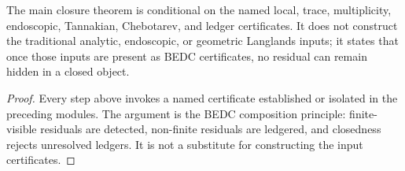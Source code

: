 \begin{theorem}
\label{thm:unified-reality-main-closure-boundary}
The main closure theorem is conditional on the named local, trace,
multiplicity, endoscopic, Tannakian, Chebotarev, and ledger
certificates. It does not construct the traditional analytic,
endoscopic, or geometric Langlands inputs; it states that once those
inputs are present as BEDC certificates, no residual can remain hidden
in a closed object.
\end{theorem}
\begin{proof}
Every step above invokes a named certificate established or isolated in
the preceding modules. The argument is the BEDC composition principle:
finite-visible residuals are detected, non-finite residuals are
ledgered, and closedness rejects unresolved ledgers. It is not a
substitute for constructing the input certificates.
\end{proof}

